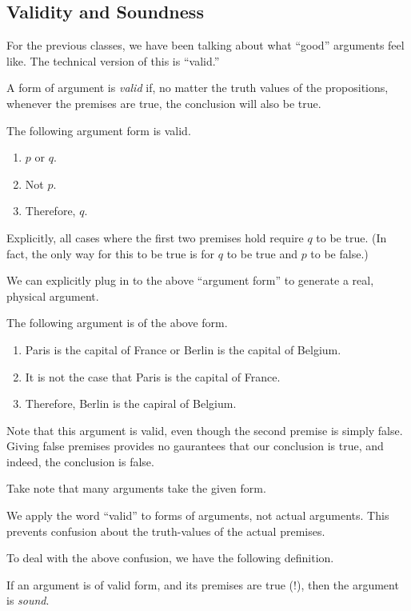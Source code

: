 \subsection{Validity and Soundness}
For the previous classes, we have been talking about what ``good'' arguments feel like. The technical version of this is ``valid.''
\begin{definition}[Valid]
	A form of argument is \textit{valid} if, no matter the truth values of the propositions, whenever the premises are true, the conclusion will also be true.
\end{definition}
\begin{example}
	The following argument form is valid.
	\begin{enumerate}
		\item $p$ or $q$.
		\item Not $p$.
		\item Therefore, $q$.
	\end{enumerate}
	Explicitly, all cases where the first two premises hold require $q$ to be true. (In fact, the only way for this to be true is for $q$ to be true and $p$ to be false.)
\end{example}
We can explicitly plug in to the above ``argument form'' to generate a real, physical argument.
\begin{example}
	The following argument is of the above form.
	\begin{enumerate}
		\item Paris is the capital of France or Berlin is the capital of Belgium.
		\item It is not the case that Paris is the capital of France.
		\item Therefore, Berlin is the capiral of Belgium.
	\end{enumerate}
	Note that this argument is valid, even though the second premise is simply false. Giving false premises provides no gaurantees that our conclusion is true, and indeed, the conclusion is false.
\end{example}
Take note that many arguments take the given form.
\begin{warn}
	We apply the word ``valid'' to forms of arguments, not actual arguments. This prevents confusion about the truth-values of the actual premises.
\end{warn}
To deal with the above confusion, we have the following definition.
\begin{definition}[Sound]
	If an argument is of valid form, and its premises are true (!), then the argument is \textit{sound}.
\end{definition}
